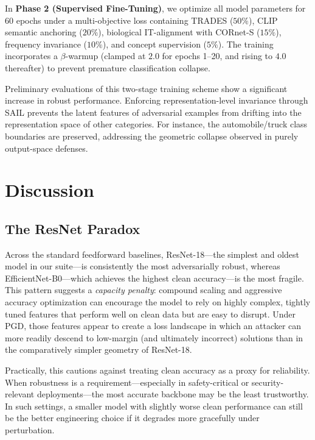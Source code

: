 \documentclass[12pt,a4paper]{article}
\begin{document}
In \textbf{Phase 2 (Supervised Fine-Tuning)}, we optimize all model parameters for 60 epochs under a multi-objective loss containing TRADES ($50\%$), CLIP semantic anchoring ($20\%$), biological IT-alignment with CORnet-S ($15\%$), frequency invariance ($10\%$), and concept supervision ($5\%$). The training incorporates a $\beta$-warmup (clamped at $2.0$ for epochs 1--20, and rising to $4.0$ thereafter) to prevent premature classification collapse. 

Preliminary evaluations of this two-stage training scheme show a significant increase in robust performance. Enforcing representation-level invariance through SAIL prevents the latent features of adversarial examples from drifting into the representation space of other categories. For instance, the automobile/truck class boundaries are preserved, addressing the geometric collapse observed in purely output-space defenses.

\section{Discussion}
\label{sec:discussion}

\subsection{The ResNet Paradox}

Across the standard feedforward baselines, ResNet-18---the simplest and
oldest model in our suite---is consistently the most adversarially robust,
whereas EfficientNet-B0---which achieves the highest clean accuracy---is the
most fragile. This pattern suggests a \emph{capacity penalty}: compound scaling
and aggressive accuracy optimization can encourage the model to rely on highly
complex, tightly tuned features that perform well on clean data but are easy to
disrupt. Under PGD, those features appear to create a loss landscape in which an
attacker can more readily descend to low-margin (and ultimately incorrect)
solutions than in the comparatively simpler geometry of ResNet-18.

Practically, this cautions against treating clean accuracy as a proxy for
reliability. When robustness is a requirement---especially in safety-critical or
security-relevant deployments---the most accurate backbone may be the least
trustworthy. In such settings, a smaller model with slightly worse clean
performance can still be the better engineering choice if it degrades more
gracefully under perturbation.
\end{document}

